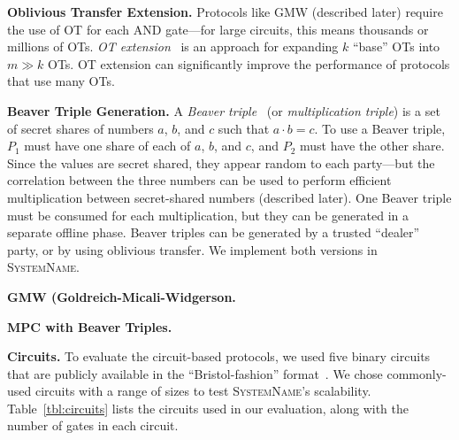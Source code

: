 \documentclass[conference]{IEEEtran}
\renewcommand{\paragraph}[1]{\vspace*{2pt}\noindent\textbf{#1}}
\newcommand{\system}{\textsc{SystemName}\xspace}
\begin{document}
\paragraph{Oblivious Transfer Extension.}
Protocols like GMW (described later) require the use of OT for each AND gate---for large circuits, this means thousands or millions of OTs. \emph{OT extension}~\cite{todo} is an approach for expanding $k$ ``base'' OTs into $m \gg k$ OTs. OT extension can significantly improve the performance of protocols that use many OTs.

\paragraph{Beaver Triple Generation.}
A \emph{Beaver triple}~\cite{todo} (or \emph{multiplication triple}) is a set of secret shares of numbers $a$, $b$, and $c$ such that $a \cdot b = c$. To use a Beaver triple, $P_1$ must have one share of each of $a$, $b$, and $c$, and $P_2$ must have the other share. Since the values are secret shared, they appear random to each party---but the correlation between the three numbers can be used to perform efficient multiplication between secret-shared numbers (described later). One Beaver triple must be consumed for each multiplication, but they can be generated in a separate offline phase. Beaver triples can be generated by a trusted ``dealer'' party, or by using oblivious transfer. We implement both versions in \system.

\paragraph{GMW (Goldreich-Micali-Widgerson.}

\paragraph{MPC with Beaver Triples.}

\paragraph{Circuits.}
To evaluate the circuit-based protocols, we used five binary circuits that are publicly available in the ``Bristol-fashion'' format~\cite{todo}. We chose commonly-used circuits with a range of sizes to test \system's scalability. Table~\ref{tbl:circuits} lists the circuits used in our evaluation, along with the number of gates in each circuit.
\end{document}
